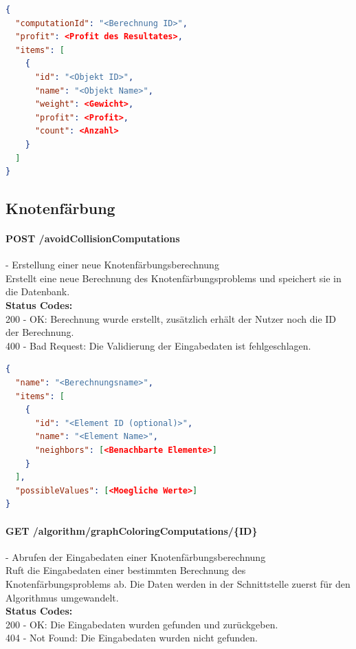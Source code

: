 \begin{lstlisting}[language=JSON, caption=Beispiel eines Endresultates für das Rucksack-Problem, label=lst:solution_knapsack]  
{
  "computationId": "<Berechnung ID>",
  "profit": <Profit des Resultates>,
  "items": [
    {
      "id": "<Objekt ID>",
      "name": "<Objekt Name>",
      "weight": <Gewicht>,
      "profit": <Profit>,
      "count": <Anzahl>
    }
  ]
}
\end{lstlisting}

%
%
%
%

\subsection{Knotenfärbung}

\paragraph{POST /avoidCollisionComputations} - Erstellung einer neue Knotenfärbungsberechnung\mbox{}\\
Erstellt eine neue Berechnung des Knotenfärbungsproblems und speichert sie in die Datenbank.\\
\textbf{Status Codes:}\\
200 - OK: Berechnung wurde erstellt, zusätzlich erhält der Nutzer noch die ID der Berechnung.\\
400 - Bad Request: Die Validierung der Eingabedaten ist fehlgeschlagen.\\

\begin{lstlisting}[language=JSON, caption=Beispiel einer Eingabe für das Knotenfärbungsproblem, label=lst:input_graphcoloring]  
{
  "name": "<Berechnungsname>",
  "items": [
    {
      "id": "<Element ID (optional)>",
      "name": "<Element Name>",
      "neighbors": [<Benachbarte Elemente>]
    }
  ],
  "possibleValues": [<Moegliche Werte>]
}
\end{lstlisting}

\paragraph{GET /algorithm/graphColoringComputations/\{ID\}} - Abrufen der Eingabedaten einer Knotenfärbungsberechnung \mbox{}\\
Ruft die Eingabedaten einer bestimmten Berechnung des Knotenfärbungsproblems ab. Die Daten werden in der Schnittstelle zuerst für den Algorithmus umgewandelt.\\
\textbf{Status Codes:}\\
200 - OK: Die Eingabedaten wurden gefunden und zurückgeben.\\
404 - Not Found: Die Eingabedaten wurden nicht gefunden.\\

